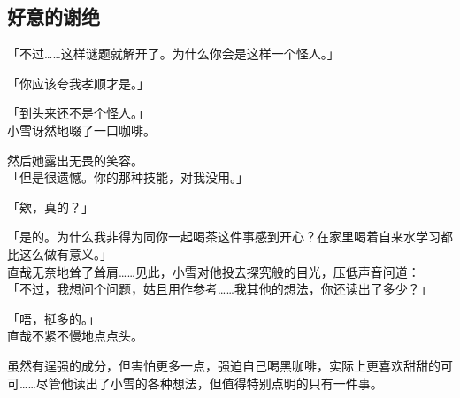 \subsection{好意的谢绝}

「不过……这样谜题就解开了。为什么你会是这样一个怪人。」

「你应该夸我孝顺才是。」

「到头来还不是个怪人。」\\

小雪讶然地啜了一口咖啡。

然后她露出无畏的笑容。\\

「但是很遗憾。你的那种技能，对我没用。」

「欸，真的？」

「是的。为什么我非得为同你一起喝茶这件事感到开心？在家里喝着自来水学习都比这么做有意义。」\\

直哉无奈地耸了耸肩……见此，小雪对他投去探究般的目光，压低声音问道：\\

「不过，我想问个问题，姑且用作参考……我其他的想法，你还读出了多少？」

「唔，挺多的。」\\

直哉不紧不慢地点点头。

虽然有逞强的成分，但害怕更多一点，强迫自己喝黑咖啡，实际上更喜欢甜甜的可可……尽管他读出了小雪的各种想法，但值得特别点明的只有一件事。\\

